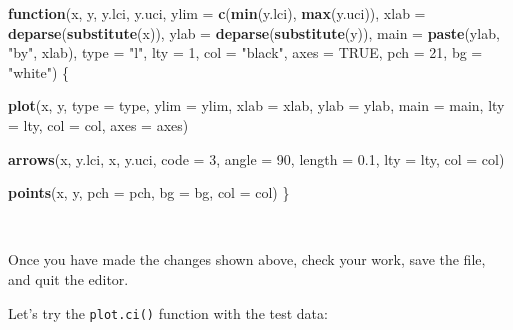 \documentclass[12pt,a4paper]{book}
\newenvironment{Shaded}{\begin{snugshade}}{\end{snugshade}}
\newcommand{\KeywordTok}[1]{\textcolor[rgb]{0.13,0.29,0.53}{\textbf{#1}}}
\newcommand{\DataTypeTok}[1]{\textcolor[rgb]{0.13,0.29,0.53}{#1}}
\newcommand{\DecValTok}[1]{\textcolor[rgb]{0.00,0.00,0.81}{#1}}
\newcommand{\FloatTok}[1]{\textcolor[rgb]{0.00,0.00,0.81}{#1}}
\newcommand{\StringTok}[1]{\textcolor[rgb]{0.31,0.60,0.02}{#1}}
\newcommand{\OtherTok}[1]{\textcolor[rgb]{0.56,0.35,0.01}{#1}}
\newcommand{\ControlFlowTok}[1]{\textcolor[rgb]{0.13,0.29,0.53}{\textbf{#1}}}
\newcommand{\OperatorTok}[1]{\textcolor[rgb]{0.81,0.36,0.00}{\textbf{#1}}}
\newcommand{\NormalTok}[1]{#1}
\theoremstyle{definition}
\theoremstyle{definition}
\theoremstyle{definition}
\theoremstyle{remark}
\begin{document}
\begin{Shaded}
\begin{Highlighting}[]
\ControlFlowTok{function}\NormalTok{(x,}
\NormalTok{         y, y.lci, y.uci,}
         \DataTypeTok{ylim =} \KeywordTok{c}\NormalTok{(}\KeywordTok{min}\NormalTok{(y.lci), }\KeywordTok{max}\NormalTok{(y.uci)),}
         \DataTypeTok{xlab =} \KeywordTok{deparse}\NormalTok{(}\KeywordTok{substitute}\NormalTok{(x)),}
         \DataTypeTok{ylab =} \KeywordTok{deparse}\NormalTok{(}\KeywordTok{substitute}\NormalTok{(y)),}
         \DataTypeTok{main =} \KeywordTok{paste}\NormalTok{(ylab, }\StringTok{"by"}\NormalTok{, xlab),}
         \DataTypeTok{type =} \StringTok{"l"}\NormalTok{,}
         \DataTypeTok{lty =} \DecValTok{1}\NormalTok{,}
         \DataTypeTok{col =} \StringTok{"black"}\NormalTok{,}
         \DataTypeTok{axes =} \OtherTok{TRUE}\NormalTok{,}
         \DataTypeTok{pch =} \DecValTok{21}\NormalTok{,}
         \DataTypeTok{bg =} \StringTok{"white"}\NormalTok{) \{}

  \KeywordTok{plot}\NormalTok{(x, y, }\DataTypeTok{type =}\NormalTok{ type, }\DataTypeTok{ylim =}\NormalTok{ ylim, }\DataTypeTok{xlab =}\NormalTok{ xlab, }\DataTypeTok{ylab =}\NormalTok{ ylab,}
       \DataTypeTok{main =}\NormalTok{ main, }\DataTypeTok{lty =}\NormalTok{ lty, }\DataTypeTok{col =}\NormalTok{ col, }\DataTypeTok{axes =}\NormalTok{ axes)}
  
  \KeywordTok{arrows}\NormalTok{(x, y.lci, x, y.uci, }\DataTypeTok{code =} \DecValTok{3}\NormalTok{, }\DataTypeTok{angle =} \DecValTok{90}\NormalTok{, }\DataTypeTok{length =} \FloatTok{0.1}\NormalTok{,}
         \DataTypeTok{lty =}\NormalTok{ lty, }\DataTypeTok{col =}\NormalTok{ col)}
  
  \KeywordTok{points}\NormalTok{(x, y, }\DataTypeTok{pch =}\NormalTok{ pch, }\DataTypeTok{bg =}\NormalTok{ bg, }\DataTypeTok{col =}\NormalTok{ col)}
\NormalTok{\}}
\end{Highlighting}
\end{Shaded}

~

Once you have made the changes shown above, check your work, save the
file, and quit the editor.

\newpage

Let's try the \texttt{plot.ci()} function with the test data:

~

\begin{Shaded}
\end{Shaded}
\end{document}
